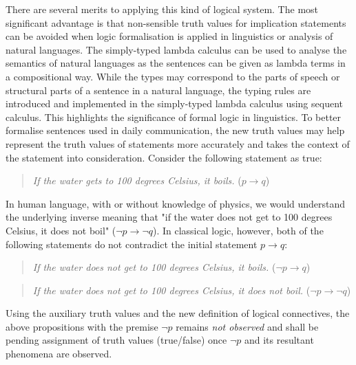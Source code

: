 \documentclass{article}
\begin{document}
There are several merits to applying this kind of logical system. The most
significant advantage is that non-sensible truth values for implication
statements can be avoided when logic formalisation is applied in linguistics
or analysis of natural languages. The simply-typed lambda
calculus{\cite{Lambda}} can be used to analyse the semantics of natural
languages as the sentences can be given as lambda terms in a compositional way.
While the types may correspond to the parts of speech or structural parts of a
sentence in a natural language, the typing rules are introduced and implemented
in the simply-typed lambda calculus using sequent calculus. This highlights the
significance of formal logic in linguistics. To better formalise sentences used
in daily communication, the new truth values may help represent the truth values
of statements more accurately and takes the context of the statement into
consideration. Consider the following statement as true:

\begin{quote}
    \textit{If the water gets to 100 degrees Celsius, it boils.} ($p \to q$)
\end{quote}

In human language, with or without knowledge of physics, we would understand
the underlying inverse meaning that "if the water does not get to 100 degrees
Celsius, it does not boil" ($\neg p \to \neg q$). In classical logic, however,
both of the following statements do not contradict the initial statement
$p \to q$:

\begin{quote}
    \textit{If the water does not get to 100 degrees Celsius, it boils.}
    ($\neg p \to q$)
\end{quote}

\begin{quote}
    \textit{If the water does not get to 100 degrees Celsius, it does not boil.}
    ($\neg p \to \neg q$)
\end{quote}

Using the auxiliary truth values and the new definition of logical connectives,
the above propositions with the premise $\neg p$ remains \textit{not observed}
and shall be pending assignment of truth values (true/false) once $\neg p$ and
its resultant phenomena are observed.

\bigskip
\end{document}
